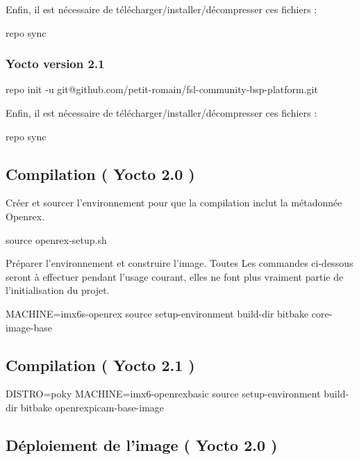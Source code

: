 Enfin, il est nécessaire de télécharger/installer/décompresser ces fichiers :

\begin{tcolorbox}
	repo sync
\end{tcolorbox}

\subsubsection{Yocto version 2.1}
\begin{tcolorbox}
	repo init -u git@github.com/petit-romain/fsl-community-bsp-platform.git
\end{tcolorbox}

Enfin, il est nécessaire de télécharger/installer/décompresser ces fichiers :

\begin{tcolorbox}
	repo sync
\end{tcolorbox}

\subsection{Compilation ( Yocto 2.0 )}
Créer et sourcer l'environnement pour que la compilation inclut la métadonnée Openrex.

\begin{tcolorbox}
	source openrex-setup.sh
\end{tcolorbox}

Préparer l’environnement et construire l’image. Toutes Les commandes ci-dessous seront à effectuer pendant l’usage courant, elles ne font plus vraiment partie de l’initialisation du projet.


\begin{tcolorbox}
	MACHINE=imx6s-openrex source setup-environment build-dir
	bitbake core-image-base
\end{tcolorbox}

\subsection{Compilation ( Yocto 2.1 )}

\begin{tcolorbox}DISTRO=poky MACHINE=imx6-openrexbasic source setup-environment build-dir
	bitbake openrexpicam-base-image
\end{tcolorbox}

\subsection{Déploiement de l’image ( Yocto 2.0 )}

